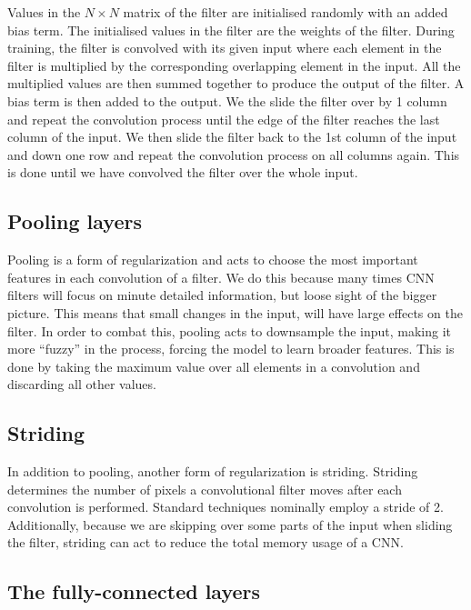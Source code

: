 Values in the $N \times N$ matrix of the filter are initialised 
randomly with an added bias term. The initialised values in the 
filter are the weights of the filter. During training, the filter is 
convolved with its given input where each element in the filter 
is multiplied by the corresponding overlapping element in the 
input. All the multiplied values are then summed together to produce 
the output of the filter. A bias term is then added to the 
output. We the slide the filter over by 1 column and repeat 
the convolution process until the edge of the filter reaches 
the last column of the input. We then slide the filter back to 
the 1st column of the input and down one row and repeat 
the convolution process on all columns again. This is done 
until we have convolved the filter over the whole input.

\subsection{Pooling layers}
Pooling is a form of regularization and acts to choose 
the most important features in each convolution of a filter. 
We do this because many times \ac{CNN} filters will focus 
on minute detailed information, but loose sight of the 
bigger picture. This means that small changes in the 
input, will have large effects on the filter. In order to 
combat this, pooling acts to downsample the input, making 
it more ``fuzzy'' in the process, forcing the model 
to learn broader features.
This is done by taking the maximum value over all elements 
in a convolution and discarding all other values. 

\subsection{Striding}
In addition to pooling, another form of regularization is 
striding. Striding determines the number of pixels a 
convolutional filter moves after each convolution 
is performed. Standard techniques nominally employ 
a stride of 2. Additionally, because we are skipping 
over some parts of the input when sliding the filter, 
striding can act to reduce the total memory usage of a 
\ac{CNN}.

\subsection{The fully-connected layers}

